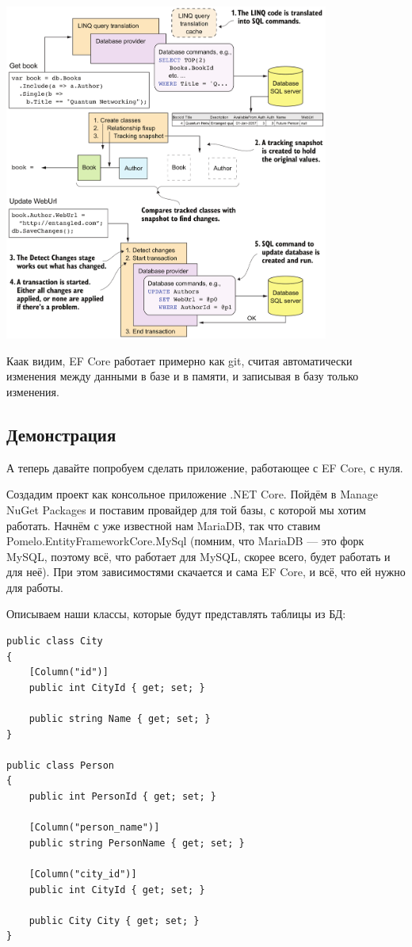 \documentclass{../../text-style}
\begin{document}
\begin{center}
    \includegraphics[width=0.8\textwidth]{efCoreUpdate.png}
\end{center}

Каак видим, EF Core работает примерно как git, считая автоматически изменения между данными в базе и в памяти, и записывая в базу только изменения.

\subsection{Демонстрация}

А теперь давайте попробуем сделать приложение, работающее с EF Core, с нуля.

Создадим проект как консольное приложение .NET Core. Пойдём в Manage NuGet Packages и поставим провайдер для той базы, с которой мы хотим работать. Начнём с уже известной нам MariaDB, так что ставим Pomelo.EntityFrameworkCore.MySql (помним, что MariaDB --- это форк MySQL, поэтому всё, что работает для MySQL, скорее всего, будет работать и для неё). При этом зависимостями скачается и сама EF Core, и всё, что ей нужно для работы.

Описываем наши классы, которые будут представлять таблицы из БД:

\begin{verbatim}
public class City
{
    [Column("id")]
    public int CityId { get; set; }

    public string Name { get; set; }
}

public class Person
{
    public int PersonId { get; set; }

    [Column("person_name")]
    public string PersonName { get; set; }

    [Column("city_id")]
    public int CityId { get; set; }

    public City City { get; set; }
}
\end{verbatim}
\end{document}
